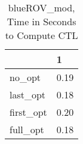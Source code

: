 \begin{table}
\caption{blueROV\_mod, Time in Seconds to Compute CTL}
\label{blueROV_mod_CTL_time}
\begin{tabular}{ll}
\toprule
 & 1 \\
\midrule
no\_opt & 0.19 \\
last\_opt & 0.18 \\
first\_opt & 0.20 \\
full\_opt & 0.18 \\
\bottomrule
\end{tabular}
\end{table}

